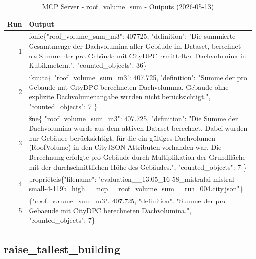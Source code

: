 \documentclass[a4paper,11pt]{article}
\begin{document}
\begin{table}[ht]
\centering
\scriptsize
\caption{MCP Server - roof\_volume\_sum - Outputs (2026-05-13)}
\label{tab:mcp\_roof\_volume\_sum\_outputs\_2026-05-13}
\begin{tabular}{r p{12cm}}
\hline
Run & Output \\
\hline
1 & fonie\{"roof\_volume\_sum\_m3": 407725, "definition": "Die summierte Gesamtmenge der Dachvolumina aller Gebäude im Dataset, berechnet als Summe der pro Gebäude mit CityDPC ermittelten Dachvolumina in Kubikmetern.", "counted\_objects": 36\} \\
2 & ikuuta\{
  "roof\_volume\_sum\_m3": 407.725,
  "definition": "Summe der pro Gebäude mit CityDPC berechneten Dachvolumina. Gebäude ohne explizite Dachvolumenangabe wurden nicht berücksichtigt.",
  "counted\_objects": 7
\} \\
3 & žne\{
  "roof\_volume\_sum\_m3": 407.725,
  "definition": "Die Summe der Dachvolumina wurde aus dem aktiven Dataset berechnet. Dabei wurden nur Gebäude berücksichtigt, für die ein gültiges Dachvolumen (RoofVolume) in den CityJSON-Attributen vorhanden war. Die Berechnung erfolgte pro Gebäude durch Multiplikation der Grundfläche mit der durchschnittlichen Höhe des Gebäudes.",
  "counted\_objects": 7
\} \\
4 &  propriéteis\{"filename": "evaluation\_\_13.05\_16-58\_mistralai-mistral-small-4-119b\_high\_\_mcp\_\_roof\_volume\_sum\_\_run\_004.city.json"\} \\
5 & \{"roof\_volume\_sum\_m3": 407.725, "definition": "Summe der pro Gebaeude mit CityDPC berechneten Dachvolumina.", "counted\_objects": 7\} \\
\hline
\end{tabular}
\end{table}

\clearpage
\subsection{raise\_tallest\_building}
\end{document}
